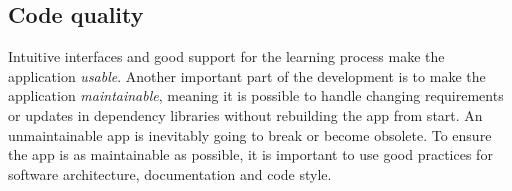 \subsection{Code quality}

Intuitive interfaces and good support for the learning process make the application \textit{usable}. Another important part of the development is to make the application \textit{maintainable}, meaning it is possible to handle changing requirements or updates in dependency libraries without rebuilding the app from start. An unmaintainable app is inevitably going to break or become obsolete. To ensure the app is as maintainable as possible, it is important to use good practices for software architecture, documentation and code style.
